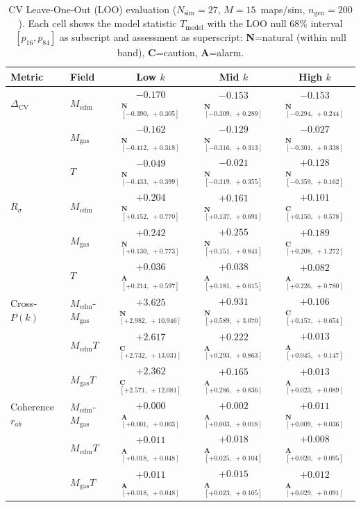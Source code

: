 \begin{table}
\centering
\caption{CV Leave-One-Out (LOO) evaluation ($N_{\mathrm{sim}}=27$, $M=15$~maps/sim, $n_{\mathrm{gen}}=200$). Each cell shows the model statistic $T_{\mathrm{model}}$ with the LOO null 68\% interval $[p_{16}, p_{84}]$ as subscript and assessment as superscript: \textbf{N}=natural (within null band), \textbf{C}=caution, \textbf{A}=alarm.}
\label{tab:cv_loo}
\begin{tabular}{llccc}
\hline\hline
Metric & Field & Low $k$ & Mid $k$ & High $k$ \\
\hline
$\Delta_{\mathrm{CV}}$ & $M_{\mathrm{cdm}}$ & $-0.170$$_{[-0.390,\ +0.305]}^{\textbf{N}}$ & $-0.153$$_{[-0.309,\ +0.289]}^{\textbf{N}}$ & $-0.153$$_{[-0.294,\ +0.244]}^{\textbf{N}}$ \\
 & $M_{\mathrm{gas}}$ & $-0.162$$_{[-0.412,\ +0.318]}^{\textbf{N}}$ & $-0.129$$_{[-0.316,\ +0.313]}^{\textbf{N}}$ & $-0.027$$_{[-0.301,\ +0.338]}^{\textbf{N}}$ \\
 & $T$ & $-0.049$$_{[-0.433,\ +0.399]}^{\textbf{N}}$ & $-0.021$$_{[-0.319,\ +0.355]}^{\textbf{N}}$ & $+0.128$$_{[-0.359,\ +0.162]}^{\textbf{N}}$ \\
\hline
$R_\sigma$ & $M_{\mathrm{cdm}}$ & $+0.204$$_{[+0.152,\ +0.770]}^{\textbf{N}}$ & $+0.161$$_{[+0.137,\ +0.691]}^{\textbf{N}}$ & $+0.101$$_{[+0.150,\ +0.578]}^{\textbf{C}}$ \\
 & $M_{\mathrm{gas}}$ & $+0.242$$_{[+0.130,\ +0.773]}^{\textbf{N}}$ & $+0.255$$_{[+0.151,\ +0.841]}^{\textbf{N}}$ & $+0.189$$_{[+0.208,\ +1.272]}^{\textbf{C}}$ \\
 & $T$ & $+0.036$$_{[+0.214,\ +0.597]}^{\textbf{A}}$ & $+0.038$$_{[+0.181,\ +0.615]}^{\textbf{A}}$ & $+0.082$$_{[+0.226,\ +0.780]}^{\textbf{A}}$ \\
\hline
Cross-$P(k)$ & $M_{\mathrm{cdm}}$-$M_{\mathrm{gas}}$ & $+3.625$$_{[+2.982,\ +10.946]}^{\textbf{N}}$ & $+0.931$$_{[+0.589,\ +3.070]}^{\textbf{N}}$ & $+0.106$$_{[+0.157,\ +0.654]}^{\textbf{C}}$ \\
 & $M_{\mathrm{cdm}}$\text{--}$T$ & $+2.617$$_{[+2.732,\ +13.031]}^{\textbf{C}}$ & $+0.222$$_{[+0.293,\ +0.863]}^{\textbf{A}}$ & $+0.013$$_{[+0.045,\ +0.147]}^{\textbf{A}}$ \\
 & $M_{\mathrm{gas}}$\text{--}$T$ & $+2.362$$_{[+2.571,\ +12.081]}^{\textbf{C}}$ & $+0.165$$_{[+0.286,\ +0.836]}^{\textbf{A}}$ & $+0.013$$_{[+0.023,\ +0.089]}^{\textbf{A}}$ \\
\hline
Coherence $r_{ab}$ & $M_{\mathrm{cdm}}$-$M_{\mathrm{gas}}$ & $+0.000$$_{[+0.001,\ +0.003]}^{\textbf{A}}$ & $+0.002$$_{[+0.003,\ +0.018]}^{\textbf{A}}$ & $+0.011$$_{[+0.009,\ +0.036]}^{\textbf{N}}$ \\
 & $M_{\mathrm{cdm}}$\text{--}$T$ & $+0.011$$_{[+0.018,\ +0.048]}^{\textbf{A}}$ & $+0.018$$_{[+0.025,\ +0.104]}^{\textbf{A}}$ & $+0.008$$_{[+0.020,\ +0.095]}^{\textbf{A}}$ \\
 & $M_{\mathrm{gas}}$\text{--}$T$ & $+0.011$$_{[+0.018,\ +0.048]}^{\textbf{A}}$ & $+0.015$$_{[+0.023,\ +0.105]}^{\textbf{A}}$ & $+0.012$$_{[+0.029,\ +0.091]}^{\textbf{A}}$ \\
\hline
\end{tabular}
\end{table}
